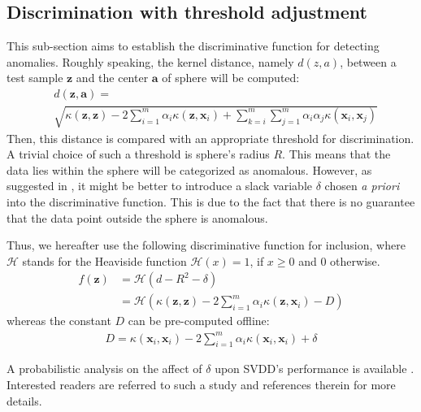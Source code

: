\documentclass[conference]{IEEEtran}
\theoremstyle{problemstyle}
\begin{document}
\subsection{Discrimination with threshold adjustment}

This sub-section aims to establish the discriminative function for detecting anomalies. Roughly speaking, the kernel distance, namely $d \left( z, a \right)$, between a test sample $\mathbf{z}$ and the center $\mathbf{a}$ of sphere will be computed:
\begin{align}
&d \left( \mathbf{z}, \mathbf{a} \right) = \nonumber \\ &\sqrt{\kappa \left( \mathbf{z}, \mathbf{z} \right) - 2 \sum_{i=1}^m \alpha_i \kappa \left( \mathbf{z}, \mathbf{x}_i \right) + \sum_{k=i}^m \sum_{j=1}^m \alpha_i \alpha_j \kappa \left( \mathbf{x}_i, \mathbf{x}_j \right)}
\end{align}
Then, this distance is compared with an appropriate threshold for discrimination. A trivial choice of such a threshold is sphere's radius $R$. This means that the data lies within the sphere will be categorized as anomalous. However, as suggested in \cite[Section~7.1]{shawe2004kernel}, it might be better to introduce a slack variable $\delta$ chosen \emph{a priori} into the discriminative function. This is due to the fact that there is no guarantee that the data point outside the sphere is anomalous.

Thus, we hereafter use the following discriminative function for inclusion, where $\mathcal{H}$ stands for the Heaviside function $\mathcal{H}(x) = 1$, if $x \ge 0$ and $0$ otherwise.
\begin{align}
f \left( \mathbf{z} \right) &= \mathcal{H} \left( d - R^2 - \delta \right) \nonumber \\
&= \mathcal{H} \left( \kappa \left( \mathbf{z}, \mathbf{z} \right) - 2 \sum_{i=1}^m \alpha_i \kappa \left( \mathbf{z}, \mathbf{x}_i \right) - D \right) \label{eq:decision_fcn}
\end{align}
whereas the constant $D$ can be pre-computed offline:
\begin{align}
D = \kappa \left( \mathbf{x}_i, \mathbf{x}_i \right) - 2 \sum_{i=1}^m \alpha_i \kappa \left( \mathbf{x}_i, \mathbf{x}_i \right) + \delta
\end{align}

A probabilistic analysis on the affect of $\delta$ upon SVDD's performance is available \cite[Theorem~7.9]{shawe2004kernel}. Interested readers are referred to such a study and references therein for more details. 
\end{document}
